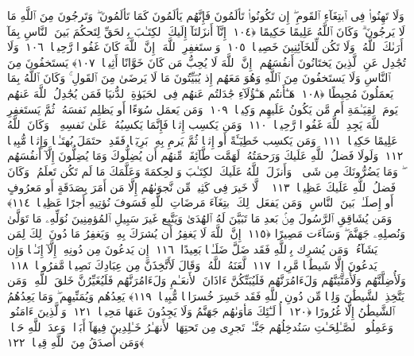  وَلَا تَهِنُوا۟ فِى ٱبتِغَآءِ ٱلقَومِ ۖ إِن تَكُونُوا۟ تَألَمُونَ فَإِنَّهُم يَألَمُونَ كَمَا تَألَمُونَ ۖ وَتَرجُونَ مِنَ ٱللَّهِ مَا لَا يَرجُونَ ۗ وَكَانَ ٱللَّهُ عَلِيمًا حَكِيمًا ﴿١٠٤﴾
 إِنَّآ أَنزَلنَآ إِلَيكَ ٱلكِتَـٰبَ بِٱلحَقِّ لِتَحكُمَ بَينَ ٱلنَّاسِ بِمَآ أَرَىٰكَ ٱللَّهُ ۚ وَلَا تَكُن لِّلخَآئِنِينَ خَصِيمًۭا ﴿١٠٥﴾
 وَٱستَغفِرِ ٱللَّهَ ۖ إِنَّ ٱللَّهَ كَانَ غَفُورًۭا رَّحِيمًۭا ﴿١٠٦﴾
 وَلَا تُجَٰدِل عَنِ ٱلَّذِينَ يَختَانُونَ أَنفُسَهُم ۚ إِنَّ ٱللَّهَ لَا يُحِبُّ مَن كَانَ خَوَّانًا أَثِيمًۭا ﴿١٠٧﴾
 يَستَخفُونَ مِنَ ٱلنَّاسِ وَلَا يَستَخفُونَ مِنَ ٱللَّهِ وَهُوَ مَعَهُم إِذ يُبَيِّتُونَ مَا لَا يَرضَىٰ مِنَ ٱلقَولِ ۚ وَكَانَ ٱللَّهُ بِمَا يَعمَلُونَ مُحِيطًا ﴿١٠٨﴾
 هَـٰٓأَنتُم هَـٰٓؤُلَآءِ جَٰدَلتُم عَنهُم فِى ٱلحَيَوٰةِ ٱلدُّنيَا فَمَن يُجَٰدِلُ ٱللَّهَ عَنهُم يَومَ ٱلقِيَـٰمَةِ أَم مَّن يَكُونُ عَلَيهِم وَكِيلًۭا ﴿١٠٩﴾
 وَمَن يَعمَل سُوٓءًا أَو يَظلِم نَفسَهُۥ ثُمَّ يَستَغفِرِ ٱللَّهَ يَجِدِ ٱللَّهَ غَفُورًۭا رَّحِيمًۭا ﴿١١٠﴾
 وَمَن يَكسِب إِثمًۭا فَإِنَّمَا يَكسِبُهُۥ عَلَىٰ نَفسِهِۦ ۚ وَكَانَ ٱللَّهُ عَلِيمًا حَكِيمًۭا ﴿١١١﴾
 وَمَن يَكسِب خَطِيٓـَٔةً أَو إِثمًۭا ثُمَّ يَرمِ بِهِۦ بَرِيٓـًۭٔا فَقَدِ ٱحتَمَلَ بُهتَـٰنًۭا وَإِثمًۭا مُّبِينًۭا ﴿١١٢﴾
 وَلَولَا فَضلُ ٱللَّهِ عَلَيكَ وَرَحمَتُهُۥ لَهَمَّت طَّآئِفَةٌۭ مِّنهُم أَن يُضِلُّوكَ وَمَا يُضِلُّونَ إِلَّآ أَنفُسَهُم ۖ وَمَا يَضُرُّونَكَ مِن شَىءٍۢ ۚ وَأَنزَلَ ٱللَّهُ عَلَيكَ ٱلكِتَـٰبَ وَٱلحِكمَةَ وَعَلَّمَكَ مَا لَم تَكُن تَعلَمُ ۚ وَكَانَ فَضلُ ٱللَّهِ عَلَيكَ عَظِيمًۭا ﴿١١٣﴾
 ۞ لَّا خَيرَ فِى كَثِيرٍۢ مِّن نَّجوَىٰهُم إِلَّا مَن أَمَرَ بِصَدَقَةٍ أَو مَعرُوفٍ أَو إِصلَـٰحٍۭ بَينَ ٱلنَّاسِ ۚ وَمَن يَفعَل ذَٟلِكَ ٱبتِغَآءَ مَرضَاتِ ٱللَّهِ فَسَوفَ نُؤتِيهِ أَجرًا عَظِيمًۭا ﴿١١٤﴾
 وَمَن يُشَاقِقِ ٱلرَّسُولَ مِنۢ بَعدِ مَا تَبَيَّنَ لَهُ ٱلهُدَىٰ وَيَتَّبِع غَيرَ سَبِيلِ ٱلمُؤمِنِينَ نُوَلِّهِۦ مَا تَوَلَّىٰ وَنُصلِهِۦ جَهَنَّمَ ۖ وَسَآءَت مَصِيرًا ﴿١١٥﴾
 إِنَّ ٱللَّهَ لَا يَغفِرُ أَن يُشرَكَ بِهِۦ وَيَغفِرُ مَا دُونَ ذَٟلِكَ لِمَن يَشَآءُ ۚ وَمَن يُشرِك بِٱللَّهِ فَقَد ضَلَّ ضَلَـٰلًۢا بَعِيدًا ﴿١١٦﴾
 إِن يَدعُونَ مِن دُونِهِۦٓ إِلَّآ إِنَـٰثًۭا وَإِن يَدعُونَ إِلَّا شَيطَٰنًۭا مَّرِيدًۭا ﴿١١٧﴾
 لَّعَنَهُ ٱللَّهُ ۘ وَقَالَ لَأَتَّخِذَنَّ مِن عِبَادِكَ نَصِيبًۭا مَّفرُوضًۭا ﴿١١٨﴾
 وَلَأُضِلَّنَّهُم وَلَأُمَنِّيَنَّهُم وَلَءَامُرَنَّهُم فَلَيُبَتِّكُنَّ ءَاذَانَ ٱلأَنعَـٰمِ وَلَءَامُرَنَّهُم فَلَيُغَيِّرُنَّ خَلقَ ٱللَّهِ ۚ وَمَن يَتَّخِذِ ٱلشَّيطَٰنَ وَلِيًّۭا مِّن دُونِ ٱللَّهِ فَقَد خَسِرَ خُسرَانًۭا مُّبِينًۭا ﴿١١٩﴾
 يَعِدُهُم وَيُمَنِّيهِم ۖ وَمَا يَعِدُهُمُ ٱلشَّيطَٰنُ إِلَّا غُرُورًا ﴿١٢٠﴾
 أُو۟لَـٰٓئِكَ مَأوَىٰهُم جَهَنَّمُ وَلَا يَجِدُونَ عَنهَا مَحِيصًۭا ﴿١٢١﴾
 وَٱلَّذِينَ ءَامَنُوا۟ وَعَمِلُوا۟ ٱلصَّـٰلِحَـٰتِ سَنُدخِلُهُم جَنَّـٰتٍۢ تَجرِى مِن تَحتِهَا ٱلأَنهَـٰرُ خَـٰلِدِينَ فِيهَآ أَبَدًۭا ۖ وَعدَ ٱللَّهِ حَقًّۭا ۚ وَمَن أَصدَقُ مِنَ ٱللَّهِ قِيلًۭا ﴿١٢٢﴾
